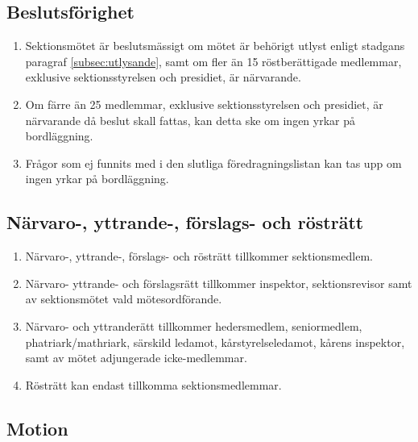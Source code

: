 \documentclass[11pt,a4paper]{article}
\begin{document}
\subsection{Beslutsförighet}

\begin{enumerate}[\thesubsection .1]

  \item Sektionsmötet är beslutsmässigt om mötet är behörigt utlyst
  enligt stadgans paragraf \ref{subsec:utlysande}, samt om fler än 15 röstberättigade medlemmar, exklusive sektionsstyrelsen och presidiet, är närvarande.

  \item Om färre än 25 medlemmar, exklusive sektionsstyrelsen och presidiet, är närvarande då beslut skall fattas, kan detta ske om ingen yrkar på bordläggning.
  
  \item Frågor som ej funnits med i den slutliga föredragningslistan kan tas upp om ingen yrkar på bordläggning.

\end{enumerate}

\subsection{Närvaro-, yttrande-, förslags- och rösträtt}

\begin{enumerate}[\thesubsection .1]

  \item Närvaro-, yttrande-, förslags- och rösträtt tillkommer sektionsmedlem.
  
  \item Närvaro- yttrande- och förslagsrätt tillkommer inspektor, sektionsrevisor samt av sektionsmötet vald mötesordförande.
  
  \item Närvaro- och yttranderätt tillkommer
  heders\-med\-lem, seniormedlem, phatriark/mathriark, särskild ledamot, kår\-styr\-else\-leda\-mot, kårens inspektor, samt av mötet adjungerade icke-medlemmar.



  \item Rösträtt kan endast tillkomma sektionsmedlemmar.

\end{enumerate}

\subsection{Motion}
\end{document}
